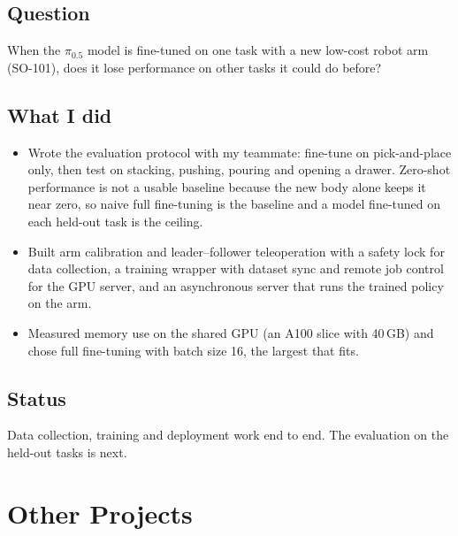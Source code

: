 \documentclass[10.5pt,a4paper]{article}
\begin{document}
\subsection{Question}
When the $\pi_{0.5}$ model is fine-tuned on one task with a new low-cost robot arm (SO-101), does it lose performance on other tasks it could do before?

\subsection{What I did}
\begin{itemize}
  \item Wrote the evaluation protocol with my teammate: fine-tune on pick-and-place only, then test on stacking, pushing, pouring and opening a drawer. Zero-shot performance is not a usable baseline because the new body alone keeps it near zero, so naive full fine-tuning is the baseline and a model fine-tuned on each held-out task is the ceiling.
  \item Built arm calibration and leader--follower teleoperation with a safety lock for data collection, a training wrapper with dataset sync and remote job control for the GPU server, and an asynchronous server that runs the trained policy on the arm.
  \item Measured memory use on the shared GPU (an A100 slice with 40\,GB) and chose full fine-tuning with batch size 16, the largest that fits.
\end{itemize}

\subsection{Status}
Data collection, training and deployment work end to end. The evaluation on the held-out tasks is next.

\newpage
\section{Other Projects}
\end{document}
